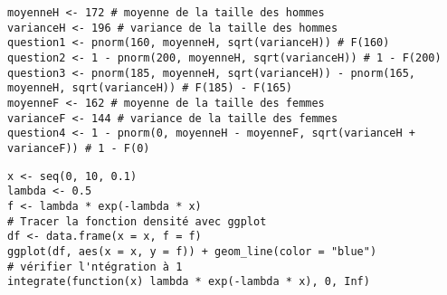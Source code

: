 \begin{lstlisting}[caption=Code : Exercice sur la loi normale, label=lst:exo]
moyenneH <- 172 # moyenne de la taille des hommes
varianceH <- 196 # variance de la taille des hommes
question1 <- pnorm(160, moyenneH, sqrt(varianceH)) # F(160)
question2 <- 1 - pnorm(200, moyenneH, sqrt(varianceH)) # 1 - F(200)
question3 <- pnorm(185, moyenneH, sqrt(varianceH)) - pnorm(165, moyenneH, sqrt(varianceH)) # F(185) - F(165)
moyenneF <- 162 # moyenne de la taille des femmes
varianceF <- 144 # variance de la taille des femmes
question4 <- 1 - pnorm(0, moyenneH - moyenneF, sqrt(varianceH + varianceF)) # 1 - F(0)
\end{lstlisting}



\begin{lstlisting}[caption=Code : Vérification de la densité de probabilité de la loi exponentielle, label=lst:exp]
x <- seq(0, 10, 0.1)
lambda <- 0.5
f <- lambda * exp(-lambda * x)
# Tracer la fonction densité avec ggplot
df <- data.frame(x = x, f = f)
ggplot(df, aes(x = x, y = f)) + geom_line(color = "blue")
# vérifier l'ntégration à 1
integrate(function(x) lambda * exp(-lambda * x), 0, Inf)  
\end{lstlisting}


